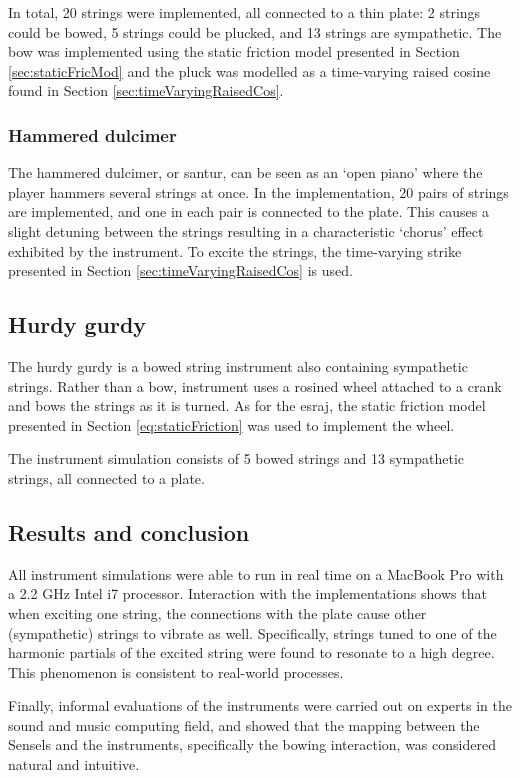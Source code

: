 In total, 20 strings were implemented, all connected to a thin plate: 2 strings could be bowed, 5 strings could be plucked, and 13 strings are sympathetic. The bow was implemented using the static friction model presented in Section \ref{sec:staticFricMod} and the pluck was modelled as a time-varying raised cosine found in Section \ref{sec:timeVaryingRaisedCos}.

\subsubsection{Hammered dulcimer}
The hammered dulcimer, or santur, can be seen as an `open piano' where the player hammers several strings at once. In the implementation, 20 pairs of strings are implemented, and one in each pair is connected to the plate. This causes a slight detuning between the strings resulting in a characteristic `chorus' effect exhibited by the instrument. To excite the strings, the time-varying strike presented in Section \ref{sec:timeVaryingRaisedCos} is used.

\subsection{Hurdy gurdy}
The hurdy gurdy is a bowed string instrument also containing sympathetic strings. Rather than a bow, instrument uses a rosined wheel attached to a crank and bows the strings as it is turned. As for the esraj, the static friction model presented in Section \ref{eq:staticFriction} was used to implement the wheel. 

The instrument simulation consists of 5 bowed strings and 13 sympathetic strings, all connected to a plate. 

\subsection{Results and conclusion}
All instrument simulations were able to run in real time on a MacBook Pro with a 2.2 GHz Intel i7 processor.
Interaction with the implementations shows that when exciting one string, the connections with the plate cause other (sympathetic) strings to vibrate as well. Specifically, strings tuned to one of the harmonic partials of the excited string were found to resonate to a high degree. This phenomenon is consistent to real-world processes.

Finally, informal evaluations of the instruments were carried out on experts in the sound and music computing field, and showed that the mapping between the Sensels and the instruments, specifically the bowing interaction, was considered natural and intuitive.